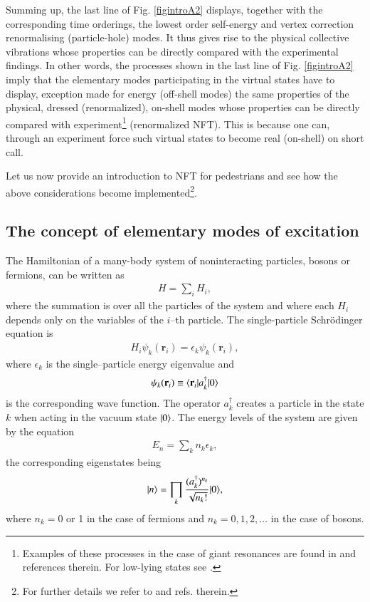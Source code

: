 Summing up, the last line of Fig. \ref{figintroA2} displays, together with the corresponding time orderings, the lowest order self-energy and vertex correction renormalising (particle-hole) modes. It thus gives rise to the physical collective vibrations whose properties can be directly compared with the experimental findings. In other words, the processes shown in the last line of   Fig. \ref{figintroA2} imply that the elementary modes participating in the virtual states have to display, exception made for energy (off-shell modes) the same properties of the physical, dressed (renormalized), on-shell modes whose properties can be directly compared with experiment\footnote{Examples of these processes in the case of giant resonances are found in \cite{Bortignon:81,Bertsch:83} and references therein. For low-lying states see \cite{Barranco:04}.} (renormalized NFT). This is because one can, through an experiment
force such virtual states to become real (on-shell) on short call.

Let us now provide an introduction to NFT for pedestrians and see how the above considerations become  implemented\footnote{For further details we refer to \cite{Bortignon:77} and refs. therein.}.
\subsection[The concept of elementary modes of excitation]{The concept of elementary modes of excitation}\label{C1S7.1}
The Hamiltonian of a many-body system of noninteracting particles, bosons or fermions, can be written as
\begin{align}\label{eqC1A1}
H=\sum_iH_i,
\end{align}
where the summation is over all the particles of the system and where each $H_i$ depends only on the variables of the $i$--th particle. The single-particle Schr\"odinger equation is
\begin{align}\label{eqC1A2}
H_i\psi_k(\mathbf r_i)=\epsilon_k \psi_k(\mathbf r_i),
\end{align}
where $\epsilon_k$ is the single--particle energy eigenvalue and 
\begin{align}\label{eqC1A3}
\psi_k(\mathbf r_i)\equiv\langle {\mathbf r_i}|a_k^\dagger|{0} \rangle
\end{align}
is the corresponding wave function. The operator $a_k^\dagger$ creates a particle in the state $k$ when acting in the vacuum state $|{0} \rangle$. The energy levels of the system are given by the equation
\begin{align}\label{eqC1A4}
E_n=\sum_k n_k\epsilon_k,
\end{align}
the corresponding eigenstates being
\begin{align}\label{eqC1A5}
|{n} \rangle=\prod_k\frac{(a_k^\dagger)^{n_k}}{\sqrt{n_k!}}|{0} \rangle,
\end{align}
where $n_k=0$ or 1 in the case of fermions and $n_k=0,1,2,\dots$ in the case of bosons.

